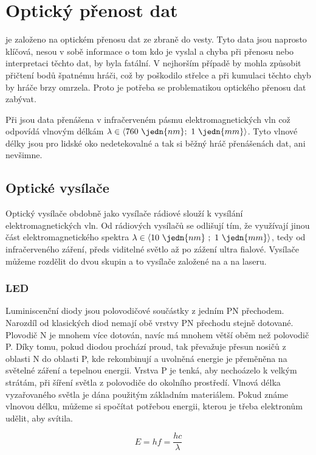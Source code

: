 \section{Optický přenost dat}
 je založeno na optickém přenosu dat ze zbraně do vesty. Tyto data jsou naprosto klíčová, nesou v sobě informace o tom kdo je vyslal a chyba při přenosu nebo interpretaci těchto dat, by byla fatální. V nejhorším případě by mohla způsobit přičtení bodů špatnému hráči, což by poškodilo střelce a při kumulaci těchto chyb by  hráče brzy omrzela. Proto je potřeba se problematikou optického přenosu dat zabývat.

Při  jsou data přenášena v infračerveném pásmu elektromagnetických vln což odpovídá vlnovým délkám $\lambda \in \langle 760~\jedn{nm};~1~\jedn{mm}\rangle$. Tyto vlnové délky jsou pro lidské oko nedetekovalné a tak si běžný hráč přenášenách dat, ani nevšimne.

\subsection{Optické vysílače}
Optický vysílače obdobně jako vysílače rádiové slouží k vysílání elektromagnetických vln. Od rádiových vysílačů  se odlišují tím, že využívají jinou část elektromagnetického spektra $\lambda \in \langle 10~\jedn{nm}~;~1~\jedn{mm}  \rangle$, tedy od infračerveného záření, předs viditelné světlo až po zážení ultra fialové. Vysílače můžeme rozdělit do dvou skupin a to vysílače založené na  a na laseru.

\subsubsection{LED}
Luminiscenční diody jsou polovodičové součástky z jedním PN přechodem. Narozdíl od klasických diod nemají  obě vrstvy PN přechodu stejně dotované. Plovodič N je mnohem více dotován, navíc má mnohem větší oběm než polovodič P. Díky tomu, pokud diodou prochází proud, tak převažuje přesun nosičů z oblasti N do oblasti P, kde rekombinují a uvolněná energie je přeměněna na světelné záření a tepelnou energii. Vrstva P je tenká, aby nechoázelo k velkým strátám, při šíření světla z polovodiče do okolního prostředí. Vlnová délka vyzařovaného světla je dána použitým základním materiálem. Pokud známe vlnovou délku, můžeme si spočítat potřebou energii, kterou je třeba elektronům udělit, aby  svítila.

$$ E = hf = \dfrac{hc}{\lambda} $$


